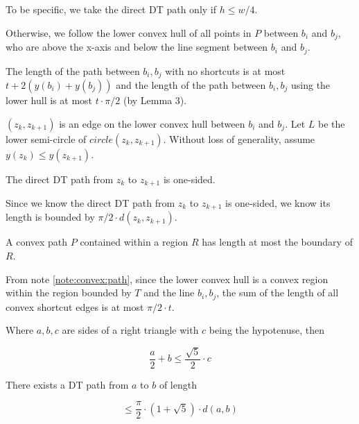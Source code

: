 \documentclass{tufte-handout}
\begin{document}
To be specific, we take the direct DT path only if $h \le w/4$.

Otherwise, we follow the lower convex hull of all points in $P$
between $b_i$ and $b_j$, who are above the x-axis and below the line
segment between $b_i$ and $b_j$.

The length of the path between $b_i,b_j$ with no shortcuts is at most
$t + 2(y(b_i) + y(b_j))$ and the length of the path between $b_i,b_j$
using the lower hull is at most $t \cdot \pi /2$ (by Lemma 3).


$(z_k,z_{k+1})$ is an edge on the lower convex hull between $b_i$ and
$b_j$.  Let $L$ be the lower semi-circle of $circle(z_k, z_{k+1})$.
Without loss of generality, assume $y(z_k) \le y(z_{k+1})$.

\begin{Lemma}

  \label{lemma:convex:path:one:sided}

  The direct DT path from $z_k$ to $z_{k+1}$ is one-sided.
  
\end{Lemma}

Since we know the direct DT path from $z_k$ to $z_{k+1}$ is one-sided,
we know its length is bounded by $\pi/2 \cdot d(z_k,z_{k+1})$.

\begin{Note}
  \label{note:convex:path}

  A convex path $P$ contained within a region $R$ has length at most
  the boundary of $R$.

\end{Note}

From note \ref{note:convex:path}, since the lower convex hull is a
convex region within the region bounded by $T$ and the line $b_i,b_j$,
the sum of the length of all convex shortcut edges is at most $\pi/2
\cdot t$.

\begin{Note}
  \label{note:right:triangle}

  Where $a,b,c$ are sides of a right triangle with $c$ being the
  hypotenuse, then

  \begin{displaymath}
    \frac{a}{2} + b \le \frac{\sqrt{5}}{2} \cdot c
  \end{displaymath}
  
\end{Note}

\begin{Theorem}

  There exists a DT path from $a$ to $b$ of length

  \begin{displaymath}
    \le \frac{\pi}{2} \cdot (1 + \sqrt{5}) \cdot d(a,b)
  \end{displaymath}

\end{Theorem}
\end{document}
